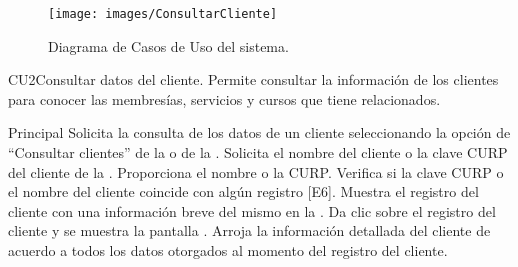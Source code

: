

\begin{figure}[htbp!]
		\centering
			\texttt{[image: images/ConsultarCliente]}
		\caption{Diagrama de Casos de Uso del sistema.}
	\end{figure}

	\begin{UseCase}{CU2}{Consultar datos del cliente.}{
		Permite consultar la información de los clientes para conocer las membresías, servicios y cursos que tiene relacionados.
	}
	\end{UseCase}

	\begin{UCtrayectoria}{Principal}
		\UCpaso[\UCactor] Solicita la consulta de los datos de un cliente seleccionando la opción de ``Consultar clientes'' de la  o de la  .
		\UCpaso Solicita el nombre del cliente o la clave CURP del cliente de la .
		\UCpaso[\UCactor] Proporciona el nombre o la CURP.
		\UCpaso Verifica si la clave CURP o el nombre del cliente coincide con algún registro [E6].
		\UCpaso Muestra el registro del cliente con una información breve del mismo en la .
		\UCpaso[\UCactor] Da clic sobre el registro del cliente y se muestra la pantalla .
		\UCpaso Arroja la información detallada del cliente de acuerdo a todos los datos otorgados al momento del registro del cliente.
		
	\end{UCtrayectoria}
	

		

	